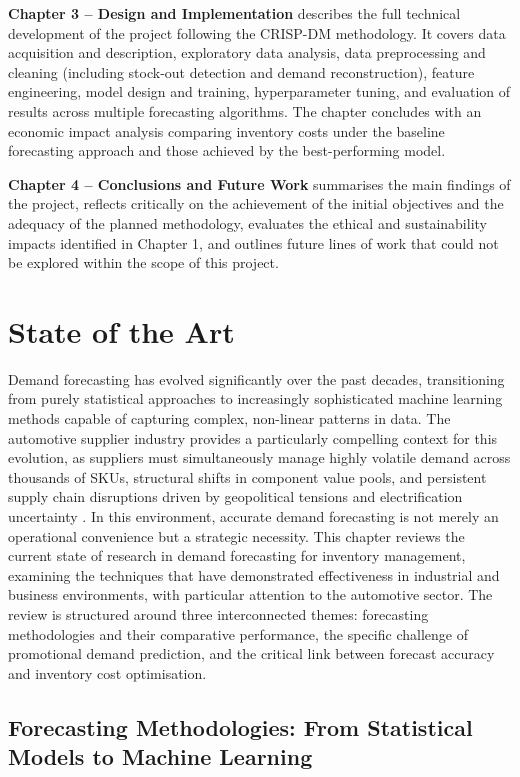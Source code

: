 \documentclass[ENG]{TFUOC}%
\begin{document}
\textbf{Chapter 3 -- Design and Implementation} describes the 
full technical development of the project following the CRISP-DM 
methodology. It covers data acquisition and description, 
exploratory data analysis, data preprocessing and cleaning 
(including stock-out detection and demand reconstruction), feature 
engineering, model design and training, hyperparameter tuning, 
and evaluation of results across multiple forecasting algorithms. 
The chapter concludes with an economic impact analysis comparing 
inventory costs under the baseline forecasting approach and those 
achieved by the best-performing model.

\textbf{Chapter 4 -- Conclusions and Future Work} summarises the 
main findings of the project, reflects critically on the 
achievement of the initial objectives and the adequacy of the 
planned methodology, evaluates the ethical and sustainability 
impacts identified in Chapter 1, and outlines future lines of 
work that could not be explored within the scope of this project.



\chapter{State of the Art}

Demand forecasting has evolved significantly over the past decades, transitioning from purely statistical approaches to increasingly sophisticated machine learning methods capable of capturing complex, non-linear patterns in data. The automotive supplier industry provides a particularly compelling context for this evolution, as suppliers must simultaneously manage highly volatile demand across thousands of SKUs, structural shifts in component value pools, and persistent supply chain disruptions driven by geopolitical tensions and electrification uncertainty \citep{bcg2026automotive}. In this environment, accurate demand forecasting is not merely an operational convenience but a strategic necessity. This chapter reviews the current state of research in demand forecasting for inventory management, examining the techniques that have demonstrated effectiveness in industrial and business environments, with particular attention to the automotive sector. The review is structured around three interconnected themes: forecasting methodologies and their comparative performance, the specific challenge of promotional demand prediction, and the critical link between forecast accuracy and inventory cost optimisation.
\section{Forecasting Methodologies: From Statistical Models to Machine Learning}
\end{document}

